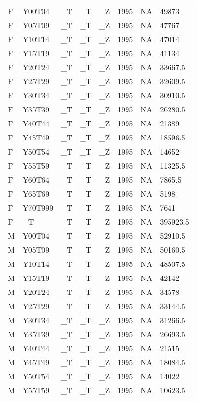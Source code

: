 \begin{longtable}[t]{llllllll}
F & Y00T04 & \_T & \_T & \_Z & 1995 & NA & 49873\\
F & Y05T09 & \_T & \_T & \_Z & 1995 & NA & 47767\\
F & Y10T14 & \_T & \_T & \_Z & 1995 & NA & 47014\\
F & Y15T19 & \_T & \_T & \_Z & 1995 & NA & 41134\\
F & Y20T24 & \_T & \_T & \_Z & 1995 & NA & 33667.5\\
\addlinespace
F & Y25T29 & \_T & \_T & \_Z & 1995 & NA & 32609.5\\
F & Y30T34 & \_T & \_T & \_Z & 1995 & NA & 30910.5\\
F & Y35T39 & \_T & \_T & \_Z & 1995 & NA & 26280.5\\
F & Y40T44 & \_T & \_T & \_Z & 1995 & NA & 21389\\
F & Y45T49 & \_T & \_T & \_Z & 1995 & NA & 18596.5\\
\addlinespace
F & Y50T54 & \_T & \_T & \_Z & 1995 & NA & 14652\\
F & Y55T59 & \_T & \_T & \_Z & 1995 & NA & 11325.5\\
F & Y60T64 & \_T & \_T & \_Z & 1995 & NA & 7865.5\\
F & Y65T69 & \_T & \_T & \_Z & 1995 & NA & 5198\\
F & Y70T999 & \_T & \_T & \_Z & 1995 & NA & 7641\\
\addlinespace
F & \_T & \_T & \_T & \_Z & 1995 & NA & 395923.5\\
M & Y00T04 & \_T & \_T & \_Z & 1995 & NA & 52910.5\\
M & Y05T09 & \_T & \_T & \_Z & 1995 & NA & 50160.5\\
M & Y10T14 & \_T & \_T & \_Z & 1995 & NA & 48507.5\\
M & Y15T19 & \_T & \_T & \_Z & 1995 & NA & 42142\\
\addlinespace
M & Y20T24 & \_T & \_T & \_Z & 1995 & NA & 34578\\
M & Y25T29 & \_T & \_T & \_Z & 1995 & NA & 33144.5\\
M & Y30T34 & \_T & \_T & \_Z & 1995 & NA & 31266.5\\
M & Y35T39 & \_T & \_T & \_Z & 1995 & NA & 26693.5\\
M & Y40T44 & \_T & \_T & \_Z & 1995 & NA & 21515\\
\addlinespace
M & Y45T49 & \_T & \_T & \_Z & 1995 & NA & 18084.5\\
M & Y50T54 & \_T & \_T & \_Z & 1995 & NA & 14022\\
M & Y55T59 & \_T & \_T & \_Z & 1995 & NA & 10623.5\\

\end{longtable}
